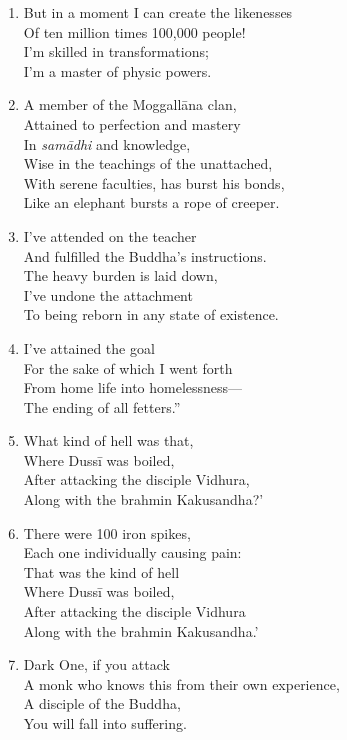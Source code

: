 \documentclass[10pt, openany]{book}
\newcommand*{\vleftofline}[1]{\leavevmode\llap{#1}}
\begin{document}
\begin{enumerate}
\item But in a moment I can create the likenesses\\
Of ten million times 100,000 people!\\
I’m skilled in transformations;\\
I’m a master of physic powers.

\item A member of the Moggallāna clan, \\
Attained to perfection and mastery\\
In \emph{samādhi} and knowledge,\\
Wise in the teachings of the unattached,\\
With serene faculties, has burst his bonds,\\
Like an elephant bursts a rope of creeper.

\item I’ve attended on the teacher\\
And fulfilled the Buddha’s instructions.\\
The heavy burden is laid down,\\
I’ve undone the attachment \\
To being reborn in any state of existence.

\item I’ve attained the goal\\
For the sake of which I went forth\\
From home life into homelessness—\\
The ending of all fetters.”

\item \vleftofline{“‘}What kind of hell was that,\\
Where Dussī was boiled,\\
After attacking the disciple Vidhura,\\
Along with the brahmin Kakusandha?’

\item \vleftofline{‘}There were 100 iron spikes,\\
Each one individually causing pain:\\
That was the kind of hell\\
Where Dussī was boiled,\\
After attacking the disciple Vidhura\\
Along with the brahmin Kakusandha.’

\item \vleftofline{‘}Dark One, if you attack\\
A monk who knows this from their own experience,\\
A disciple of the Buddha,\\
You will fall into suffering.


\end{enumerate}
\end{document}
